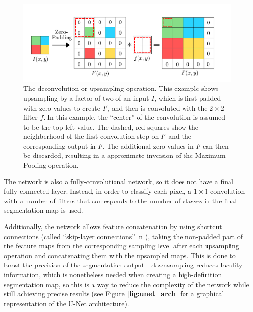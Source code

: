 \begin {figure}[!hbt]
	\begin{center}
		\includegraphics[scale=0.50]{img/fig_upconvolution}
	\end{center}
	\caption[Matrix upconvolution.]{The deconvolution or upsampling operation. This example shows upsampling by a factor of two of an input $I$, which is first padded with zero values to create $I'$, and then is convoluted with the $2 \times 2$ filter $f$. In this example, the ``center'' of the convolution is assumed to be the top left value. The dashed, red squares show the neighborhood of the first convolution step on $I'$ and the corresponding output in $F$. The additional zero values in $F$ can then be discarded, resulting in a approximate inversion of the Maximum Pooling operation. \footnotemark}
	\label{fig:upconvolution}
\end {figure}


The network is also a fully-convolutional network, so it does not have a final fully-connected layer. Instead, in order to classify each pixel, a $1 \times 1$ convolution with a number of filters that corresponds to the number of classes in the final segmentation map is used.

Additionally, the network allows feature concatenation by using shortcut connections (called ``skip-layer connections'' in \cite{bishop_pattern}), taking the non-padded part of the feature maps from the corresponding sampling level after each upsampling operation and concatenating them with the upsampled maps. This is done to boost the precision of the segmentation output - downsampling reduces locality information, which is nonetheless needed when creating a high-definition segmentation map, so this is a way to reduce the complexity of the network while still achieving precise results (see Figure \textbf{\ref{fig:unet_arch}} for a graphical representation of the U-Net architecture).\\

